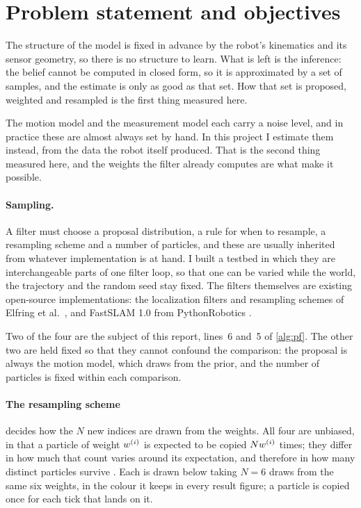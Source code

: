 \section{Problem statement and objectives}\label{sec:problem}

The structure of the model is fixed in advance by the robot's kinematics and its sensor geometry, so there is no
structure to learn. What is left is the inference: the belief cannot be computed in closed form, so it is
approximated by a set of samples, and the estimate is only as good as that set. How that set is proposed, weighted and resampled is the
first thing measured here.

The motion model and the measurement model each carry a noise level, and in practice these are almost always set
by hand. In this project I estimate them instead, from the data the robot itself produced. That is the second
thing measured here, and the weights the filter already computes are what make it possible.

\paragraph{Sampling.} A filter must choose a proposal distribution, a rule for when to resample, a resampling
scheme and a number of particles, and these are usually inherited from whatever implementation is at hand. I
built a testbed in which they are interchangeable parts of one filter loop, so that one can be varied while the
world, the trajectory and the random seed stay fixed. The filters themselves are existing open-source
implementations: the localization filters and resampling schemes of Elfring et al.\ \cite{elfring2021particle},
and FastSLAM 1.0 from PythonRobotics \cite{sakai2018pythonrobotics}.

Two of the four are the subject of this report, lines~6 and~5 of \cref{alg:pf}. The other two are held fixed so
that they cannot confound the comparison: the proposal is always the motion model, which draws from the prior,
and the number of particles is fixed within each comparison.

\paragraph{The resampling scheme} decides how the $N$ new indices are drawn from the weights. All four are
unbiased, in that a particle of weight $w^{(i)}$ is expected to be copied $Nw^{(i)}$ times; they differ in how
much that count varies around its expectation, and therefore in how many distinct particles survive
\cite{douc2005comparison,hol2006resampling}. Each is drawn below taking $N = 6$ draws from the same six weights,
in the colour it keeps in every result figure; a particle is copied once for each tick that lands on it.


